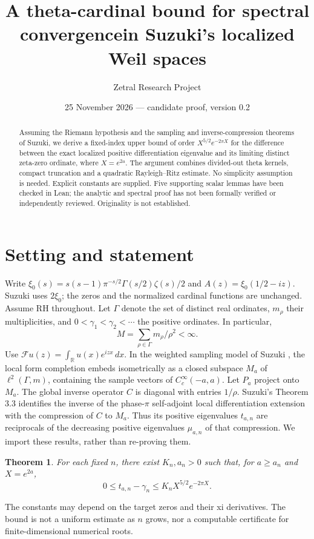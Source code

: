 \documentclass[11pt]{article}
\title{A theta-cardinal bound for spectral convergence\newline in Suzuki's localized Weil spaces}
\author{Zetral Research Project}
\date{25 November 2026 --- candidate proof, version 0.2}
\newtheorem{theorem}{Theorem}
\newcommand{\R}{\mathbb R}
\newcommand{\F}{\mathcal F}
\begin{document}
\maketitle
\begin{abstract}
Assuming the Riemann hypothesis and the sampling and inverse-compression theorems of Suzuki, we derive a fixed-index upper bound of order $X^{5/2}e^{-2\pi X}$ for the difference between the exact localized positive differentiation eigenvalue and its limiting distinct zeta-zero ordinate, where $X=e^{2a}$. The argument combines divided-out theta kernels, compact truncation and a quadratic Rayleigh--Ritz estimate. No simplicity assumption is needed. Explicit constants are supplied. Five supporting scalar lemmas have been checked in Lean; the analytic and spectral proof has not been formally verified or independently reviewed. Originality is not established.
\end{abstract}
\section{Setting and statement}
Write $\xi_0(s)=s(s-1)\pi^{-s/2}\Gamma(s/2)\zeta(s)/2$ and $A(z)=\xi_0(1/2-iz)$. Suzuki uses $2\xi_0$; the zeros and the normalized cardinal functions are unchanged. Assume RH throughout. Let $\Gamma$ denote the set of distinct real ordinates, $m_\rho$ their multiplicities, and $0<\gamma_1<\gamma_2<\cdots$ the positive ordinates. In particular,
\[
M=\sum_{\rho\in\Gamma}m_\rho/\rho^2<\infty.
\]
Use $\F u(z)=\int_{\R}u(x)e^{izx}\,dx$. In the weighted sampling model of Suzuki \cite[Eq.~(2.8)]{suzuki}, the local form completion embeds isometrically as a closed subspace $M_a$ of $\ell^2(\Gamma,m)$, containing the sample vectors of $C_c^\infty(-a,a)$. Let $P_a$ project onto $M_a$. The global inverse operator $C$ is diagonal with entries $1/\rho$. Suzuki's Theorem 3.3 identifies the inverse of the phase-$\pi$ self-adjoint local differentiation extension with the compression of $C$ to $M_a$. Thus its positive eigenvalues $t_{a,n}$ are reciprocals of the decreasing positive eigenvalues $\mu_{a,n}$ of that compression. We import these results, rather than re-proving them.
\begin{theorem}
For each fixed $n$, there exist $K_n,a_n>0$ such that, for $a\ge a_n$ and $X=e^{2a}$,
\[
0\le t_{a,n}-\gamma_n\le K_n X^{5/2}e^{-2\pi X}.
\]
\end{theorem}
The constants may depend on the target zeros and their xi derivatives. The bound is not a uniform estimate as $n$ grows, nor a computable certificate for finite-dimensional numerical roots.
\end{document}
